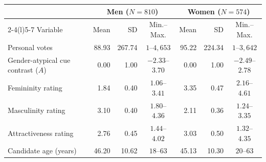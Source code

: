 \begin{tabular}{@{}lrrc@{\hspace{1.5em}}rrc@{}}
\toprule
 & \multicolumn{3}{c}{Men ($N=810$)} & \multicolumn{3}{c}{Women ($N=574$)} \\
\cmidrule(lr){2-4}\cmidrule(l){5-7}
Variable & Mean & SD & Min.--Max. & Mean & SD & Min.--Max. \\
\midrule
Personal votes & 88.93 & 267.74 & $1$--$4,653$ & 95.22 & 224.34 & $1$--$3,642$ \\
Gender-atypical cue contrast ($A$) & 0.00 & 1.00 & $-2.33$--$3.70$ & 0.00 & 1.00 & $-2.49$--$2.78$ \\
Femininity rating & 1.84 & 0.40 & $1.06$--$3.41$ & 3.35 & 0.47 & $2.16$--$4.61$ \\
Masculinity rating & 3.10 & 0.40 & $1.80$--$4.36$ & 2.11 & 0.36 & $1.24$--$3.35$ \\
Attractiveness rating & 2.76 & 0.45 & $1.44$--$4.02$ & 3.03 & 0.50 & $1.32$--$4.35$ \\
Candidate age (years) & 46.20 & 10.62 & $18$--$63$ & 45.13 & 10.30 & $20$--$63$ \\
\bottomrule
\end{tabular}
